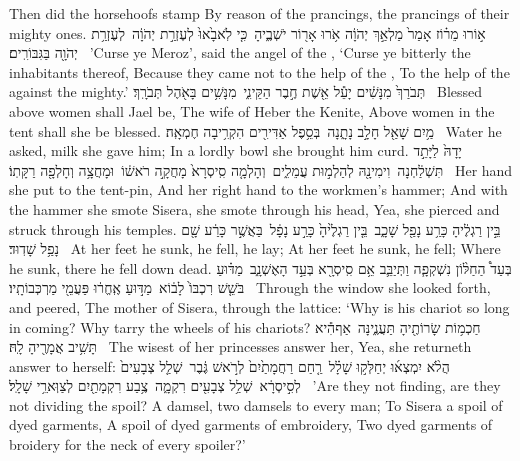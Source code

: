 {Then did the horsehoofs stamp By reason of the prancings, the prancings of their mighty ones.}
{א֣וֹרוּ מֵר֗וֹז אָמַר֙ מַלְאַ֣ךְ יְהֹוָ֔ה אֹ֥רוּ אָר֖וֹר יֹשְׁבֶ֑יהָ \setuma  כִּ֤י לֹֽא\maqqaf בָ֙אוּ֙ לְעֶזְרַ֣ת יְהֹוָ֔ה \setuma  לְעֶזְרַ֥ת יְהֹוָ֖ה בַּגִּבּוֹרִֽים׃ \setuma }
{’Curse ye Meroz’, said the angel of the \lord, ‘Curse ye bitterly the inhabitants thereof, Because they came not to the help of the \lord, To the help of the \lord\space against the mighty.’}
{תְּבֹרַךְ֙ מִנָּשִׁ֔ים יָעֵ֕ל אֵ֖שֶׁת חֶ֣בֶר הַקֵּינִ֑י \setuma  מִנָּשִׁ֥ים בָּאֹ֖הֶל תְּבֹרָֽךְ׃ \setuma }
{Blessed above women shall Jael be, The wife of Heber the Kenite, Above women in the tent shall she be blessed.}
{מַ֥יִם שָׁאַ֖ל חָלָ֣ב נָתָ֑נָה \setuma  בְּסֵ֥פֶל אַדִּירִ֖ים הִקְרִ֥יבָה חֶמְאָֽה׃ \setuma }
{Water he asked, milk she gave him; In a lordly bowl she brought him curd.}
{יָדָהּ֙ לַיָּתֵ֣ד תִּשְׁלַ֔חְנָה \setuma  וִימִינָ֖הּ לְהַלְמ֣וּת עֲמֵלִ֑ים \setuma  וְהָלְמָ֤ה סִֽיסְרָא֙ מָחֲקָ֣ה רֹאשׁ֔וֹ \setuma  וּמָחֲצָ֥ה וְחָלְפָ֖ה רַקָּתֽוֹ׃ \setuma }
{Her hand she put to the tent-pin, And her right hand to the workmen’s hammer; And with the hammer she smote Sisera, she smote through his head, Yea, she pierced and struck through his temples.}
{בֵּ֣ין רַגְלֶ֔יהָ כָּרַ֥ע נָפַ֖ל שָׁכָ֑ב \setuma  בֵּ֤ין רַגְלֶ֙יהָ֙ כָּרַ֣ע נָפָ֔ל \setuma  בַּאֲשֶׁ֣ר כָּרַ֔ע שָׁ֖ם נָפַ֥ל שָׁדֽוּד׃ \setuma }
{At her feet he sunk, he fell, he lay; At her feet he sunk, he fell; Where he sunk, there he fell down dead.}
{בְּעַד֩ הַחַלּ֨וֹן נִשְׁקְפָ֧ה וַתְּיַבֵּ֛ב אֵ֥ם סִֽיסְרָ֖א בְּעַ֣ד הָאֶשְׁנָ֑ב \setuma  מַדּ֗וּעַ בֹּשֵׁ֤שׁ רִכְבּוֹ֙ לָב֔וֹא \setuma  מַדּ֣וּעַ אֶֽחֱר֔וּ פַּעֲמֵ֖י מַרְכְּבוֹתָֽיו׃ \setuma }
{Through the window she looked forth, and peered, The mother of Sisera, through the lattice: ‘Why is his chariot so long in coming? Why tarry the wheels of his chariots?}
{חַכְמ֥וֹת שָׂרוֹתֶ֖יהָ תַּעֲנֶ֑ינָּה \setuma  אַף\maqqaf הִ֕יא תָּשִׁ֥יב אֲמָרֶ֖יהָ לָֽהּ׃ \setuma }
{The wisest of her princesses answer her, Yea, she returneth answer to herself:}
{הֲלֹ֨א יִמְצְא֜וּ יְחַלְּק֣וּ שָׁלָ֗ל \setuma  רַ֤חַם רַחֲמָתַ֙יִם֙ לְרֹ֣אשׁ גֶּ֔בֶר \setuma  שְׁלַ֤ל צְבָעִים֙ לְסִ֣יסְרָ֔א \setuma  שְׁלַ֥ל צְבָעִ֖ים רִקְמָ֑ה \setuma  צֶ֥בַע רִקְמָתַ֖יִם לְצַוְּארֵ֥י שָׁלָֽל׃ \setuma }
{’Are they not finding, are they not dividing the spoil? A damsel, two damsels to every man; To Sisera a spoil of dyed garments, A spoil of dyed garments of embroidery, Two dyed garments of broidery for the neck of every spoiler?’}

